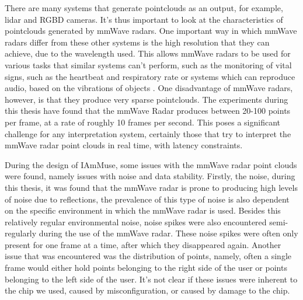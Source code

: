 There are many systems that generate pointclouds as an output, for example, lidar and RGBD cameras. 
It's thus important to look at the characteristics of pointclouds generated by mmWave radars.
One important way in which mmWave radars differ from these other systems is the high resolution that they can achieve, due to the wavelength used.
This allows mmWave radars to be used for various tasks that similar systems can't perform, such as the monitoring of vital signs, such as the heartbeat and respiratory rate \cite{wang2022heartprint, wang2023here} or systems which can reproduce audio, based on the vibrations of objects \cite{li2025acoustic, Lin2024highquality, Li2022mmphone}.
One disadvantage of mmWave radars, however, is that they produce very sparse pointclouds.
The experiments during this thesis have found that the mmWave Radar produces between 20-100 points per frame, at a rate of roughly 10 frames per second. 
This poses a significant challenge for any interpretation system, certainly those that try to interpret the mmWave radar point clouds in real time, with latency constraints.



During the design of IAmMuse, some issues with the mmWave radar point clouds were found, namely issues with noise and data stability.
Firstly, the noise, during this thesis, it was found that the mmWave radar is prone to producing high levels of noise due to reflections, the prevalence of this type of noise is also dependent on the specific environment in which the mmWave radar is used.
Besides this relatively regular environmental noise, noise spikes were also encountered semi-regularly during the use of the mmWave radar.
These noise spikes were often only present for one frame at a time, after which they disappeared again.
Another issue that was encountered was the distribution of points, namely, often a single frame would either hold points belonging to the right side of the user or points belonging to the left side of the user.
It's not clear if these issues were inherent to the chip we used, caused by misconfiguration, or caused by damage to the chip.



